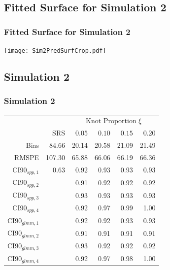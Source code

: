 \documentclass[mathserif,compress]{beamer}
\begin{document}

\subsection{Fitted Surface for Simulation 2}
\begin{frame}
\frametitle{Fitted Surface for Simulation 2}

	\begin{center} 
		\texttt{[image: Sim2PredSurfCrop.pdf]} 
	\end{center}

\end{frame}


\subsection{Simulation 2}
\begin{frame}
\frametitle{Simulation 2}

\begin{table}[ht]
\begin{center}
\begin{tabular}{rrrrrr}
	\hline
	&  & \multicolumn{4}{c}{Knot Proportion $\xi$} \\ 
	& SRS & $0.05$ & $0.10$ & $0.15$ & $0.20$ \\ 
	\hline
	Bias & 84.66 & 20.14 & 20.58 & 21.09 & 21.49 \\ 
  RMSPE & 107.30 & 65.88 & 66.06 & 66.19 & 66.36 \\ 
  CI90$_{spp,1}$ & 0.63 & 0.92 & 0.93 & 0.93 & 0.93 \\ 
  CI90$_{spp,2}$ &  & 0.91 & 0.92 & 0.92 & 0.92 \\ 
  CI90$_{spp,3}$ &  & 0.93 & 0.93 & 0.93 & 0.93 \\ 
  CI90$_{spp,4}$ &  & 0.92 & 0.97 & 0.99 & 1.00 \\ 
  CI90$_{glmm,1}$ &  & 0.92 & 0.92 & 0.93 & 0.93 \\ 
  CI90$_{glmm,2}$ &  & 0.91 & 0.91 & 0.91 & 0.91 \\ 
  CI90$_{glmm,3}$ &  & 0.93 & 0.92 & 0.92 & 0.92 \\ 
  CI90$_{glmm,4}$ &  & 0.92 & 0.97 & 0.98 & 1.00 \\ 
   \hline
\end{tabular}
\end{center}
\end{table}

\end{frame}
\end{document}
